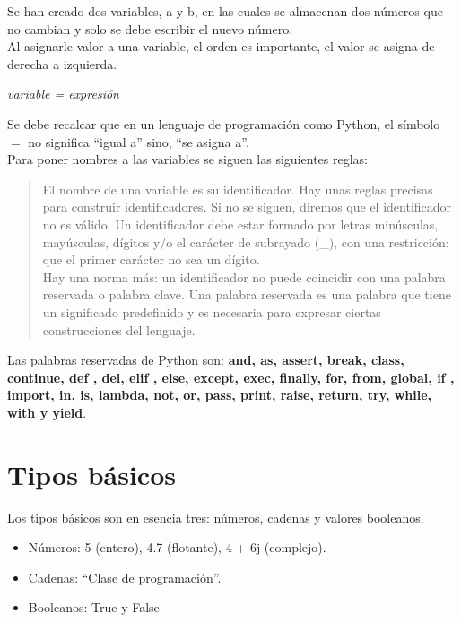 Se han creado dos variables, a y b, en las cuales se almacenan dos números que no cambian y solo se debe escribir el nuevo número.\\

Al asignarle valor a una variable, el orden es importante, el valor se asigna de derecha a izquierda.\\

\begin{center}
\textit{variable = expresión}
\end{center}

Se debe recalcar que en un lenguaje de programación como Python, el símbolo $=$ no significa ``igual a'' sino, ``se asigna a''.\\

Para poner nombres a las variables se siguen las siguientes reglas:

\begin{quotation}

El nombre de una variable es su identificador. Hay unas reglas precisas para construir identificadores. Si no se siguen, diremos que el identificador no es válido. Un identificador debe estar formado por letras minúsculas, mayúsculas, dígitos y/o el carácter de subrayado (\_), con una restricción: que el primer carácter no sea un dígito.\\

Hay una norma más: un identificador no puede coincidir con una palabra reservada o palabra clave. Una palabra reservada es una palabra que tiene un significado predefinido y es necesaria para expresar ciertas construcciones del lenguaje.
\end{quotation}

Las palabras reservadas de Python son: \textbf{and, as, assert, break, class, continue, def , del, elif , else, except, exec, finally, for, from, global, if , import, in, is, lambda, not, or, pass, print, raise, return, try, while, with y yield}.


\section{Tipos básicos}

Los tipos básicos son en esencia tres: números, cadenas y valores booleanos.

\begin{itemize}
\item Números: 5 (entero), 4.7 (flotante), 4 + 6j (complejo).
\item Cadenas: ``Clase de programación''.
\item Booleanos: True y False
\end{itemize}

